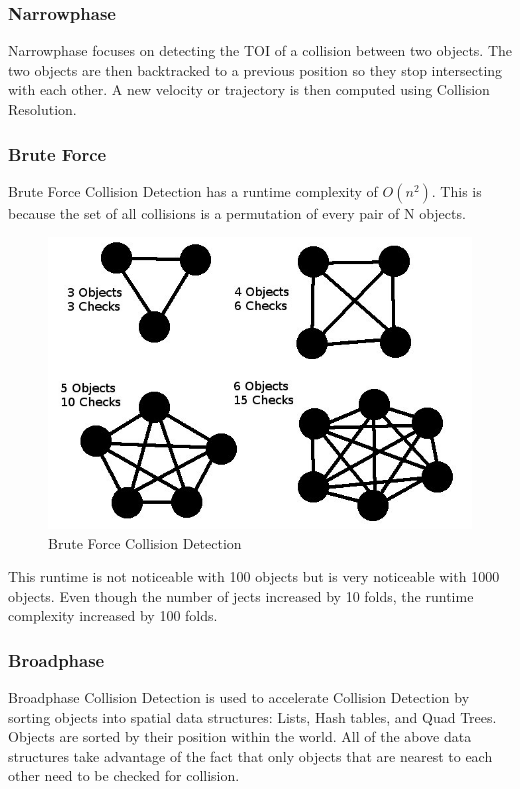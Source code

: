 \documentclass[conference]{IEEEtran}
\begin{document}
	\subsubsection{Narrowphase}
	Narrowphase focuses on detecting the TOI of a collision between two objects. The two objects are then backtracked to a previous position so they stop intersecting with each other. A new velocity or trajectory is then computed using Collision Resolution.
	\subsubsection{Brute Force}
	Brute Force Collision Detection has a runtime complexity of $O(n^2)$. This is because the set of all collisions is a permutation of every pair of N objects. 

\begin{figure}[!h]
\centering
\includegraphics[scale=0.4]{brute}
\caption{Brute Force Collision Detection}
\label{fig_sim}
\end{figure}
	
	This runtime is not noticeable with 100 objects but is very noticeable with 1000 objects. Even though the number of jects increased by 10 folds, the runtime complexity increased by 100 folds.
	\subsubsection{Broadphase}
	Broadphase Collision Detection is used to accelerate Collision Detection by sorting objects into spatial data structures: Lists, Hash tables, and Quad Trees. Objects are sorted by their position within the world. All of the above data structures take advantage of the fact that only objects that are nearest to each other need to be checked for collision.
\end{document}
